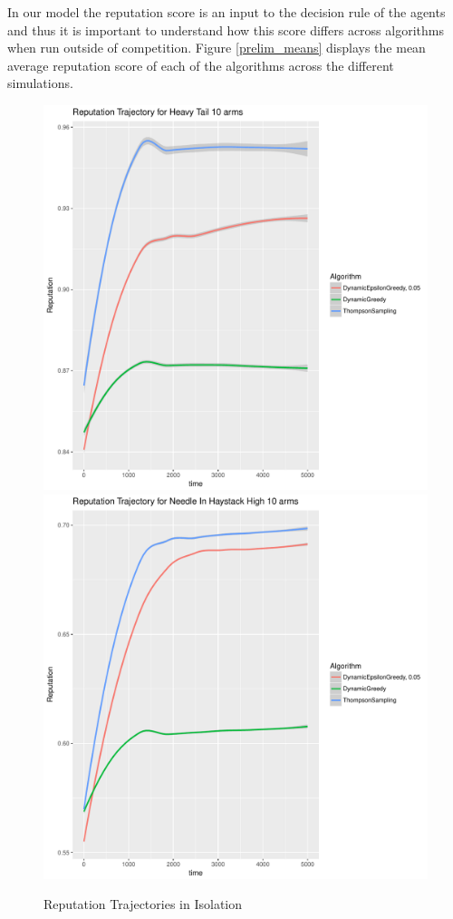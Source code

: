 \documentclass{article}
\theoremstyle{definition}
\begin{document}
In our model the reputation score is an input to the decision rule of the agents and thus it is important to understand how this score differs across algorithms when run outside of competition. Figure \ref{prelim_means} displays the mean average reputation score of each of the algorithms across the different simulations.

\begin{figure}
\caption{Reputation Trajectories in Isolation}
\includegraphics[scale=0.2]{"figures/Reputation Trajectory for Heavy Tail 10 arms"}
\includegraphics[scale=0.2]{"figures/Reputation Trajectory for Needle In Haystack High 10 arms"}

\end{figure}
\end{document}
